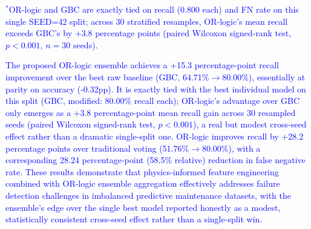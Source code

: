 \textcolor{blue}{$^{*}$OR-logic and GBC are exactly tied on recall (0.800 each) and FN rate on this single SEED=42 split; across 30 stratified resamples, OR-logic's mean recall exceeds GBC's by +3.8 percentage points (paired Wilcoxon signed-rank test, $p<0.001$, $n=30$ seeds).}

\textcolor{blue}{The proposed OR-logic ensemble achieves a +15.3 percentage-point recall improvement over the best raw baseline (GBC, 64.71\%$\to$80.00\%), essentially at parity on accuracy (-0.32pp). It is exactly tied with the best individual model on this split (GBC, modified: 80.00\% recall each); OR-logic's advantage over GBC only emerges as a +3.8 percentage-point mean recall gain across 30 resampled seeds (paired Wilcoxon signed-rank test, $p<0.001$), a real but modest cross-seed effect rather than a dramatic single-split one. OR-logic improves recall by +28.2 percentage points over traditional voting (51.76\%$\to$80.00\%), with a corresponding 28.24 percentage-point (58.5\% relative) reduction in false negative rate. These results demonstrate that physics-informed feature engineering combined with OR-logic ensemble aggregation effectively addresses failure detection challenges in imbalanced predictive maintenance datasets, with the ensemble's edge over the single best model reported honestly as a modest, statistically consistent cross-seed effect rather than a single-split win.}

